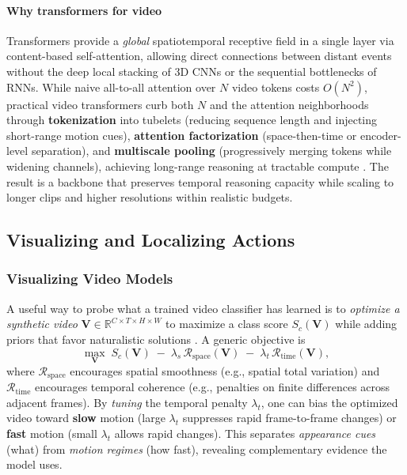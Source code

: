 \paragraph{Why transformers for video}
Transformers provide a \emph{global} spatiotemporal receptive field in a single layer via content-based self-attention, allowing direct connections between distant events without the deep local stacking of 3D CNNs or the sequential bottlenecks of RNNs. While naive all-to-all attention over $N$ video tokens costs $O(N^2)$, practical video transformers curb both $N$ and the attention neighborhoods through \textbf{tokenization} into tubelets (reducing sequence length and injecting short-range motion cues), \textbf{attention factorization} (space-then-time or encoder-level separation), and \textbf{multiscale pooling} (progressively merging tokens while widening channels), achieving long-range reasoning at tractable compute \cite{bertasius2021_timesformer,arnab2021_vivit,fan2021_mvit,li2021_improved_mvit,neimark2021_vtn}. The result is a backbone that preserves temporal reasoning capacity while scaling to longer clips and higher resolutions within realistic budgets.

\subsection{Visualizing and Localizing Actions}
\label{subsec:chapter24_visualization_localization}

\subsubsection{Visualizing Video Models}
\label{subsec:chapter24_visualizing_models}

A useful way to probe what a trained video classifier has learned is to \emph{optimize a synthetic video} $\mathbf{V}\!\in\!\mathbb{R}^{C\times T\times H\times W}$ to maximize a class score $S_c(\mathbf{V})$ while adding priors that favor naturalistic solutions \cite{feichtenhofer2018_deepreps,feichtenhofer2019_deepinsights}. A generic objective is
\begin{equation}
    \label{eq:chapter24_vis_objective}
    \max_{\mathbf{V}} \; S_c(\mathbf{V}) \;-\; \lambda_s \,\mathcal{R}_{\text{space}}(\mathbf{V}) \;-\; \lambda_t \,\mathcal{R}_{\text{time}}(\mathbf{V}),
\end{equation}
where $\mathcal{R}_{\text{space}}$ encourages spatial smoothness (e.g., spatial total variation) and $\mathcal{R}_{\text{time}}$ encourages temporal coherence (e.g., penalties on finite differences across adjacent frames). By \emph{tuning} the temporal penalty $\lambda_t$, one can bias the optimized video toward \textbf{slow} motion (large $\lambda_t$ suppresses rapid frame-to-frame changes) or \textbf{fast} motion (small $\lambda_t$ allows rapid changes). This separates \emph{appearance cues} (what) from \emph{motion regimes} (how fast), revealing complementary evidence the model uses.

